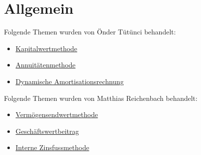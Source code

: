 \chapter{Allgemein}
\label{Einfuehrung}

Folgende Themen wurden von Önder Tütünci behandelt:

\begin{itemize}
    \item \hyperref[Kapitalwertmethode]{Kapitalwertmethode}
    \item \hyperref[Annuitaetenmethode]{Annuitätenmethode}
    \item \hyperref[Dynamische Amortisationsrechnung]{Dynamische Amortisationsrechnung}
\end{itemize}
Folgende Themen wurden von Matthias Reichenbach behandelt:

\begin{itemize}
    \item \hyperref[Vermoegensendwertmethode]{Vermögensendwertmethode}
    \item \hyperref[Geschaeftswertbeitrag]{Geschäftswertbeitrag}
    \item \hyperref[Interne Zinsfussmethode]{Interne Zinsfussmethode}
\end{itemize}
